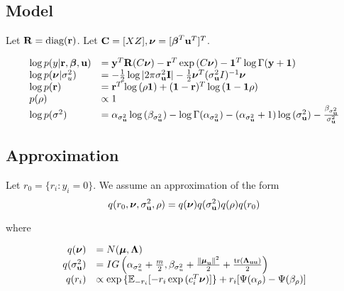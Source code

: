 \documentclass{amsart}
\begin{document}


\subsection{Model}
Let ${\bf R} = \text{diag}{({\bf r})}$. Let ${\bf C} = [X Z], {\boldsymbol \nu} = [{\boldsymbol \beta}^T {\bf u}^T]^T$.

$$
\begin{array}{ll}
\log{p(y|{\bf r}, {\boldsymbol\beta}, {\bf u})} &= {\bf y}^T {\bf R} (C{\boldsymbol \nu}) - {\bf r}^T \exp{(C{\boldsymbol\nu})} - {\bf 1}^T \log{\Gamma{({\bf y}+ {\bf1})}} \\
\log{p({\boldsymbol\nu}|\sigma_{u}^2)} &= - {\frac{1}{2}} \log{|2\pi \sigma_{{\bf u}}^2 {\bf I}|} - {\frac{1}{2}} {\boldsymbol \nu}^T(\sigma_{{\bf u}}^2 I)^{-1} {\boldsymbol \nu} \\
\log{p({\bf r})} &= {\bf r}^T \log{(\rho {\bf1})} + ({\bf 1} - {\bf r})^T\log{({\bf1}- {\bf1}\rho)} \\
p(\rho) &\propto 1 \\
\log{p(\sigma^2)} &= \alpha_{\sigma_{\bf u}^2} \log{(\beta_{\sigma_{\bf u}^2})} - \log{\Gamma{(\alpha_{\sigma_{\bf u}^2})}} - (\alpha_{\sigma_{\bf u}^2} + 1) \log{(\sigma_{{\bf u}}^2)} - \frac{\beta_{\sigma_{\bf u}^2}}{\sigma_{{\bf u}}^2}\\
\end{array}
$$

\subsection{Approximation}
Let $r_0 = \{ r_i : y_i = 0 \}$.
We assume an approximation of the form
$$
q(r_0, {\boldsymbol \nu}, \sigma_{{\bf u}}^2, \rho) = q({\boldsymbol \nu}) q(\sigma_{{\bf u}}^2) q(\rho) q(r_0) \\
$$

where

$$
\begin{array}{rl}
q({\boldsymbol \nu}) &= N({\boldsymbol \mu}, {\boldsymbol \Lambda}) \\
q(\sigma_{{\bf u}}^2) &= IG\left(\alpha_{\sigma_u^2} + \frac{m}{2}, \beta_{\sigma_u^2} + \frac{\|{\boldsymbol \mu}_{\bf u}\|^2}{2} + \frac{\text{tr}({\boldsymbol \Lambda}_{{\bf u}{\bf u}})}{2}\right) \\
q(r_i) &\propto \exp{\{{\mathbb E}_{-r_i} [-r_i \exp{(c_i^T{\boldsymbol\nu})}]\} + r_i [\Psi(\alpha_\rho) - \Psi(\beta_\rho)]} \\
\end{array}
$$
\end{document}
